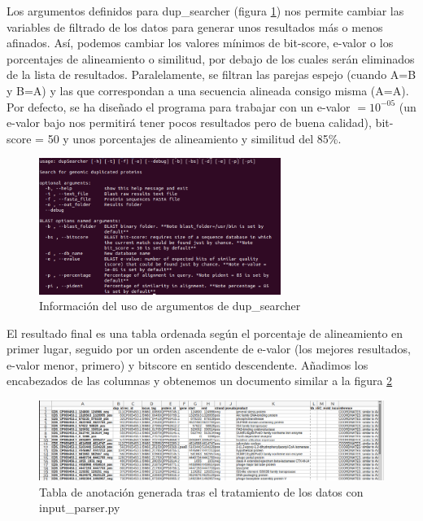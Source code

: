 Los argumentos definidos para dup\_searcher (figura \ref{fig:usage_dup_sarcher}) nos permite cambiar las variables de filtrado de los datos para generar unos resultados más o menos afinados.
Así, podemos cambiar los valores mínimos de bit-score, e-valor o los porcentajes de alineamiento o similitud, por debajo de los cuales serán eliminados de la lista de resultados. Paralelamente, se filtran las parejas espejo (cuando A=B y B=A) y las que correspondan a una secuencia alineada consigo misma (A=A). Por defecto, se ha diseñado el programa para trabajar con un e-valor $=10^{-05}$ (un e-valor bajo nos permitirá tener pocos resultados pero de buena calidad), bit-score = 50 y unos porcentajes de alineamiento y similitud del 85\%.

\begin{figure}[h]
\centering
    \includegraphics[width=0.7\textwidth]{figs/usage_dup_searcher.png}
    \caption[Información de dup\_searcher en la terminal]{Información del uso de argumentos de dup\_searcher}
    \label{fig:usage_dup_sarcher}
\end{figure}


El resultado final es una tabla ordenada según el porcentaje de alineamiento en primer lugar, seguido por un orden ascendente de  e-valor (los mejores resultados, e-valor menor, primero) y bitscore en sentido descendente. Añadimos los encabezados de las columnas y obtenemos un documento similar a la figura \ref{fig:dup_annot}

\begin{figure}[h]
	\centering
	\captionsetup{width=\linewidth} 
	\includegraphics[width=\linewidth]{figs/dup_annot.png}
	\caption[Tabla de anotación del genoma]{Tabla de anotación generada tras el tratamiento de los datos con input\_parser.py}
	\label{fig:dup_annot}
\end{figure}


